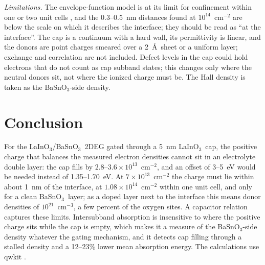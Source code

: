 \documentclass[11pt]{article}
\newcommand{\LIO}{\texorpdfstring{LaInO$_3$}{LaInO3}}
\newcommand{\BSO}{\texorpdfstring{BaSnO$_3$}{BaSnO3}}
\begin{document}
\emph{Limitations.} The envelope-function model is at its limit for confinement within one or two unit cells \cite{OwnbyMAT01}, and the 0.3--0.5~nm distances found at $10^{14}$~cm$^{-2}$ are below the scale on which it describes the interface; they should be read as ``at the interface''. The cap is a continuum with a hard wall, its permittivity is linear, and the donors are point charges smeared over a 2~\AA\ sheet or a uniform layer; exchange and correlation are not included. Defect levels in the cap could hold electrons that do not count as cap subband states; this changes only where the neutral donors sit, not where the ionized charge must be. The Hall density is taken as the \BSO-side density.

\section{Conclusion}
For the \LIO/\BSO\ 2DEG gated through a 5~nm \LIO\ cap, the positive charge that balances the measured electron densities cannot sit in an electrolyte double layer: the cap fills by $2.8$--$3.6\times10^{13}$~cm$^{-2}$, and an offset of 3--5~eV would be needed instead of 1.35--1.70~eV. At $7\times10^{13}$~cm$^{-2}$ the charge must lie within about 1~nm of the interface, at $1.08\times10^{14}$~cm$^{-2}$ within one unit cell, and only for a clean \BSO\ layer; as a doped layer next to the interface this means donor densities of $10^{21}$~cm$^{-3}$, a few percent of the oxygen sites. A capacitor relation captures these limits. Intersubband absorption is insensitive to where the positive charge sits while the cap is empty, which makes it a measure of the \BSO-side density whatever the gating mechanism, and it detects cap filling through a stalled density and a 12--23\% lower mean absorption energy. The calculations use qwkit \cite{qwkit}.



\end{document}
